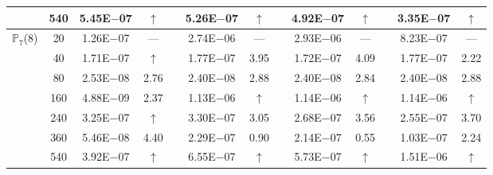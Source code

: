 \begin{table}[H]
{\begin{tabular}{@{}l c c c c c c c c c c c c@{}}
 & 540 & 5.45E$-$07 & $\uparrow$  &  & 5.26E$-$07 & $\uparrow$ &  & 4.92E$-$07 & $\uparrow$ &  & 3.35E$-$07 & $\uparrow$\\
\midrule
\multirow{7}{*}{$\mathbb{P}_{7}$(8)}
 & 20 & 1.26E$-$07 & ---  &  & 2.74E$-$06 & --- &  & 2.93E$-$06 & --- &  & 8.23E$-$07 & ---\\
 & 40 & 1.71E$-$07 & $\uparrow$  &  & 1.77E$-$07 & 3.95 &  & 1.72E$-$07 & 4.09 &  & 1.77E$-$07 & 2.22\\
 & 80 & 2.53E$-$08 & 2.76  &  & 2.40E$-$08 & 2.88 &  & 2.40E$-$08 & 2.84 &  & 2.40E$-$08 & 2.88\\
 & 160 & 4.88E$-$09 & 2.37  &  & 1.13E$-$06 & $\uparrow$ &  & 1.14E$-$06 & $\uparrow$ &  & 1.14E$-$06 & $\uparrow$\\
 & 240 & 3.25E$-$07 & $\uparrow$  &  & 3.30E$-$07 & 3.05 &  & 2.68E$-$07 & 3.56 &  & 2.55E$-$07 & 3.70\\
 & 360 & 5.46E$-$08 & 4.40  &  & 2.29E$-$07 & 0.90 &  & 2.14E$-$07 & 0.55 &  & 1.03E$-$07 & 2.24\\
 & 540 & 3.92E$-$07 & $\uparrow$  &  & 6.55E$-$07 & $\uparrow$ &  & 5.73E$-$07 & $\uparrow$ &  & 1.51E$-$06 & $\uparrow$\\
\bottomrule
\end{tabular}}
\label{PRO:bending:01_23_glob1v2}
\end{table}
